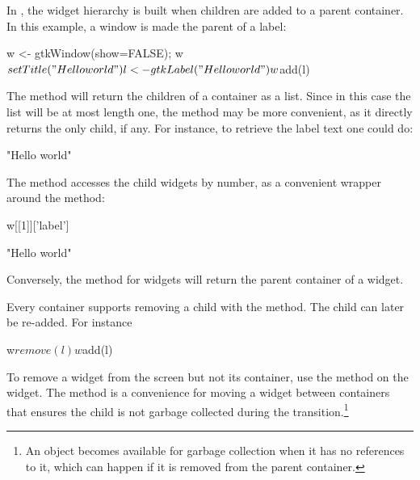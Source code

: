 In \GTK{}, the widget hierarchy is built
when children are added to a parent container.  In this example, a
window is made the parent of a label:
\begin{Schunk}
\begin{Sinput}
 w <- gtkWindow(show=FALSE); w$setTitle("Hello world")
 l <- gtkLabel("Hello world")
 w$add(l)
\end{Sinput}
\end{Schunk}

The method  will return the children
of a container as a list. Since in this case the list will be at most
length one, the  method may be more
convenient, as it directly returns the only child, if any. For
instance, to retrieve the label text one could do:
\begin{Schunk}
\begin{Soutput}
[1] "Hello world"
\end{Soutput}
\end{Schunk}
The \method{[[}{GObject} method 
accesses the child widgets by number, as a convenient wrapper
around the  method:
\begin{Schunk}
\begin{Sinput}
 w[[1]]['label']
\end{Sinput}
\begin{Soutput}
[1] "Hello world"
\end{Soutput}
\end{Schunk}
%
Conversely, the  method for \GTK\/ widgets will
return the parent container of a widget.

Every container supports removing a child with the
 method. The child can later be re-added.
For instance
\begin{Schunk}
\begin{Sinput}
 w$remove(l)
 w$add(l)
\end{Sinput}
\end{Schunk}
% 
To remove a widget from the screen but not its container, use the
 method on the widget. The
 method is a convenience for moving a
widget between containers that ensures the child is not
garbage
collected during the transition.\footnote{An object becomes available
  for garbage collection when it has no references to it, which can
  happen if it is removed from the parent container.}

